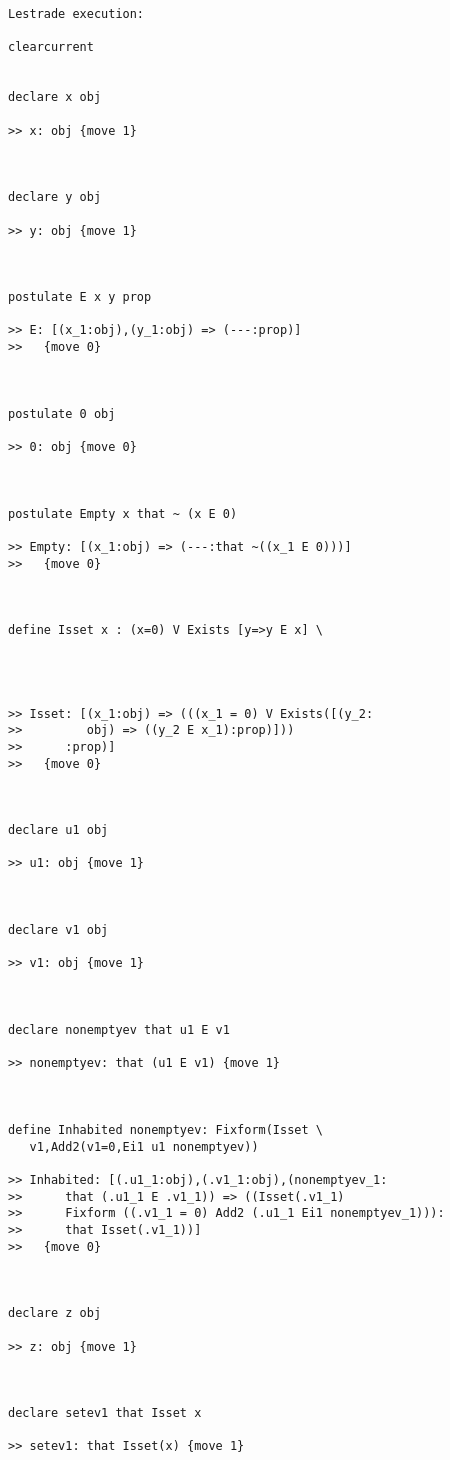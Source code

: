 \documentclass[12pt]{article}
\begin{document}
\begin{verbatim}Lestrade execution:

clearcurrent


declare x obj

>> x: obj {move 1}



declare y obj

>> y: obj {move 1}



postulate E x y prop

>> E: [(x_1:obj),(y_1:obj) => (---:prop)]
>>   {move 0}



postulate 0 obj

>> 0: obj {move 0}



postulate Empty x that ~ (x E 0)

>> Empty: [(x_1:obj) => (---:that ~((x_1 E 0)))]
>>   {move 0}



define Isset x : (x=0) V Exists [y=>y E x] \
   



>> Isset: [(x_1:obj) => (((x_1 = 0) V Exists([(y_2:
>>         obj) => ((y_2 E x_1):prop)]))
>>      :prop)]
>>   {move 0}



declare u1 obj

>> u1: obj {move 1}



declare v1 obj

>> v1: obj {move 1}



declare nonemptyev that u1 E v1

>> nonemptyev: that (u1 E v1) {move 1}



define Inhabited nonemptyev: Fixform(Isset \
   v1,Add2(v1=0,Ei1 u1 nonemptyev))

>> Inhabited: [(.u1_1:obj),(.v1_1:obj),(nonemptyev_1:
>>      that (.u1_1 E .v1_1)) => ((Isset(.v1_1)
>>      Fixform ((.v1_1 = 0) Add2 (.u1_1 Ei1 nonemptyev_1))):
>>      that Isset(.v1_1))]
>>   {move 0}



declare z obj

>> z: obj {move 1}



declare setev1 that Isset x

>> setev1: that Isset(x) {move 1}




\end{verbatim}
\end{document}
